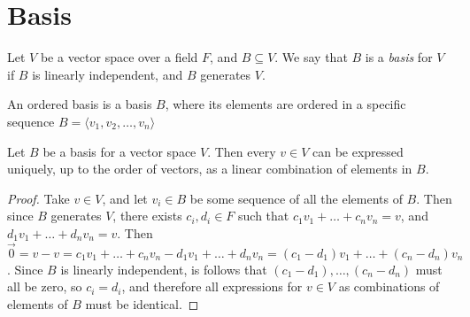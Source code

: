 \documentclass[12pt]{article}
\begin{document}
\section{Basis}

\begin{defn}
    Let $V$ be a vector space over a field $F$, and $B \subseteq V$. We say that $B$ is a \emph{basis} for $V$ if $B$ is linearly independent, and $B$ generates $V$.
\end{defn}

\begin{defn}
    An ordered basis is a basis $B$, where its elements are ordered in a specific sequence $B = \langle v_1, v_2, \ldots, v_n \rangle$
\end{defn}

\begin{prop}\label{unique-basis-expression}
    Let $B$ be a basis for a vector space $V$. Then every $v \in V$ can be expressed uniquely, up to the order of vectors, as a linear combination of elements in $B$.
\end{prop}

\begin{proof}
    Take $v \in V$, and let $v_i \in B$ be some sequence of all the elements of $B$. Then since $B$ generates $V$, there exists $c_i, d_i \in F$ such that $c_1v_1 + \ldots + c_nv_n = v$, and $d_1v_1 + \ldots + d_nv_n = v$. Then $\vec{0} = v - v = c_1v_1 + \ldots + c_nv_n - d_1v_1 + \ldots + d_nv_n = (c_1 - d_1)v_1 + \ldots + (c_n - d_n)v_n$. Since $B$ is linearly independent, is follows that $(c_1 - d_1), \ldots, (c_n - d_n)$ must all be zero, so $c_i = d_i$, and therefore all expressions for $v \in V$ as combinations of elements of $B$ must be identical.
\end{proof}
\end{document}
